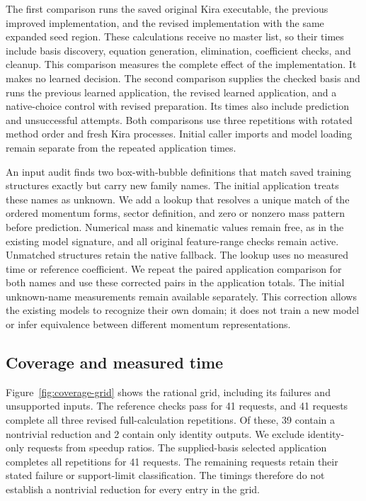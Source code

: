 The first comparison runs the saved original Kira executable, the previous improved implementation, and the revised implementation with the same expanded seed region. These calculations receive no master list, so their times include basis discovery, equation generation, elimination, coefficient checks, and cleanup. This comparison measures the complete effect of the implementation. It makes no learned decision. The second comparison supplies the checked basis and runs the previous learned application, the revised learned application, and a native-choice control with revised preparation. Its times also include prediction and unsuccessful attempts. Both comparisons use three repetitions with rotated method order and fresh Kira processes. Initial caller imports and model loading remain separate from the repeated application times.

An input audit finds two box-with-bubble definitions that match saved training structures exactly but carry new family names. The initial application treats these names as unknown. We add a lookup that resolves a unique match of the ordered momentum forms, sector definition, and zero or nonzero mass pattern before prediction. Numerical mass and kinematic values remain free, as in the existing model signature, and all original feature-range checks remain active. Unmatched structures retain the native fallback. The lookup uses no measured time or reference coefficient. We repeat the paired application comparison for both names and use these corrected pairs in the application totals. The initial unknown-name measurements remain available separately. This correction allows the existing models to recognize their own domain; it does not train a new model or infer equivalence between different momentum representations.

\subsection{Coverage and measured time}
Figure~\ref{fig:coverage-grid} shows the rational grid, including its failures and unsupported inputs. The reference checks pass for 41 requests, and 41 requests complete all three revised full-calculation repetitions. Of these, 39 contain a nontrivial reduction and 2 contain only identity outputs. We exclude identity-only requests from speedup ratios. The supplied-basis selected application completes all repetitions for 41 requests. The remaining requests retain their stated failure or support-limit classification. The timings therefore do not establish a nontrivial reduction for every entry in the grid.

